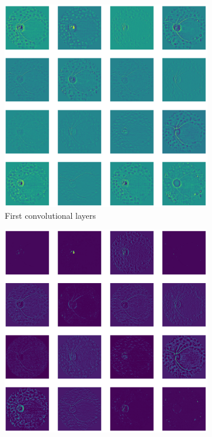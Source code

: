 \begin{figure}[tb]
    \begin{subfigure}[b]{0.49\textwidth}
        \centering
        \includegraphics[height=\textwidth,width=\textwidth]{figures/chapter6/weights/kernel.png}
        \caption{First convolutional layers}
        \label{fig:weights}
     \end{subfigure}
     \hfill
     \begin{subfigure}[b]{0.49\textwidth}
         \centering
         \includegraphics[height=\textwidth,width=\textwidth]{figures/chapter6/weights/maxpool.png}

\end{subfigure}
\end{figure}

